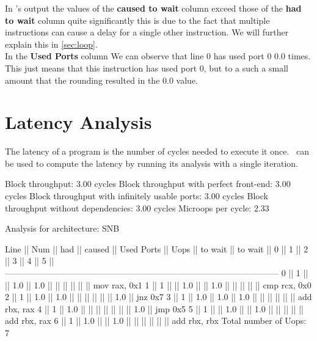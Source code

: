 In \suaca's output the values of the \textbf{caused to wait} column exceed those of the \textbf{had to wait} column quite significantly this is due to the fact that multiple instructions can cause a delay for a single other instruction. We will further explain this in \autoref{sec:loop}.\\
In the \textbf{Used Ports} column We can observe that line $0$ has used port $0$ $0.0$ times. This just means that this instruction has used port $0$, but to a such a small amount that the rounding resulted in the $0.0$ value.




\section{Latency Analysis}
\label{sec:loop}

The latency of a program is the number of cycles needed to execute it once. \suaca\ can be used to compute the latency by running its analysis with a single iteration. 

\begin{example}
    Block throughput: 3.00 cycles
    Block throughput with perfect front-end: 3.00 cycles
    Block throughput with infinitely usable ports: 3.00 cycles
    Block throughput without dependencies: 3.00 cycles
    Microops per cycle: 2.33
    
    Analysis for architecture: SNB
    
     Line  ||   Num   ||   had   || caused  ||            Used Ports
           ||   Uops  || to wait || to wait ||   0   ||   1   ||   2   ||   3   ||   4   ||   5   ||
    ------------------------------------------------------------------------------------------------
       0   ||    1    ||         ||   1.0   ||  1.0  ||       ||       ||       ||       ||       || mov rax, 0x1
       1   ||    1    ||         ||   1.0   ||       ||  1.0  ||       ||       ||       ||       || cmp rcx, 0x0
       2   ||    1    ||   1.0   ||   1.0   ||       ||       ||       ||       ||       ||  1.0  || jnz 0x7
       3   ||    1    ||   1.0   ||   1.0   ||  1.0  ||       ||       ||       ||       ||       || add rbx, rax
       4   ||    1    ||   1.0   ||         ||       ||       ||       ||       ||       ||  1.0  || jmp 0x5
       5   ||    1    ||         ||   1.0   ||       ||  1.0  ||       ||       ||       ||       || add rbx, rax
       6   ||    1    ||   1.0   ||         ||  1.0  ||       ||       ||       ||       ||       || add rbx, rbx
    Total number of Uops: 7
\end{example}

